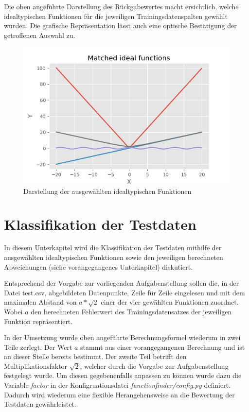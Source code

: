 Die oben angeführte Darstellung des Rückgabewertes macht ersichtlich, welche idealtypischen Funktionen für die jeweiligen Trainingsdatenspalten gewählt wurden. Die grafische Repräsentation lässt auch eine optische Bestätigung der getroffenen Auswahl zu.

\begin{figure}[h]
\centering
\includegraphics[width=12cm]{../output/figures/ideal.png}
\caption{Darstellung der ausgewählten idealtypischen Funktionen \cite{Gage:18}}
\label{fig:ideal}
\end{figure}

\section{Klassifikation der Testdaten}

In diesem Unterkapitel wird die Klassifikation der Testdaten mithilfe der ausgewählten idealtypischen Funktionen sowie den jeweiligen berechneten Abweichungen (siehe vorangegangenes Unterkapitel) diskutiert.

Entsprechend der Vorgabe zur vorliegenden Aufgabenstellung sollen die, in der Datei test.csv, abgebildeten Datenpunkte, Zeile für Zeile eingelesen und mit dem maximalen Abstand von $ a*\sqrt{2}$ einer der vier gewählten Funktionen zuordnet. Wobei $a$ den berechneten Fehlerwert des Trainingsdatensatzes der jeweiligen Funktion repräsentiert.

In der Umsetzung wurde oben angeführte Berechnungsformel wiederum in zwei Teile zerlegt. Der Wert $a$ stammt aus einer vorangegangenen Berechnung und ist an dieser Stelle bereits bestimmt. Der zweite Teil betrifft den Multiplikationsfaktor $\sqrt{2}$, welcher durch die Vorgabe zur Aufgabenstellung festgelegt wurde. Um diesen gegebenenfalls anpassen zu können wurde dazu die Variable \emph{factor} in der Konfigruationsdatei \emph{functionfinder/config.py} definiert. Dadurch wird wiederum eine flexible Herangehensweise an die Bewertung der Testdaten gewährleistet.


